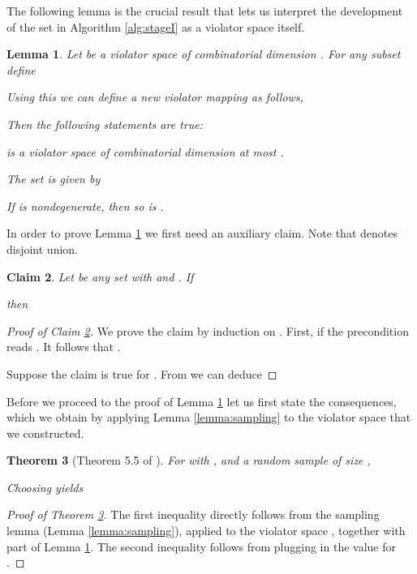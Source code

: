\documentclass[12pt]{article}
\newtheorem{theorem2}{Theorem}[section]
\newenvironment{theorem}{\begin{theorem2}}{\end{theorem2}}
\newtheorem{lemma2}[theorem2]{Lemma}
\newenvironment{lemma}{\begin{lemma2}}{\end{lemma2}}
\newtheorem{claim2}[theorem2]{Claim}
\newenvironment{claim}{\begin{claim2}}{\end{claim2}}
\theoremstyle{remark}
\let\newEnumerate=\enumerate
\renewenvironment{enumerate}{\newEnumerate\itemsep=0.0cm}{\endlist}
\begin{document}
    
    The following lemma is the crucial result that lets us interpret the development of the set  in
    Algorithm \ref{alg:stageI} as a violator space itself.
    \begin{lemma}
    \label{lemma:54}
    Let  be a violator space of combinatorial dimension . For any subset  define
    
    Using this we can define a new violator mapping as follows,
    
    Then the following statements are true:
    \begin{enumerate}
    \item[\emph{(i)}]  is a violator space of combinatorial dimension at most .
    \item[\emph{(ii)}] The set  is given by
    
    \item[\emph{(iii)}] If  is nondegenerate, then so is .
    \end{enumerate}
    \end{lemma}
    
    In order to prove Lemma \ref{lemma:54} we first need an auxiliary claim. Note that 
    denotes disjoint union.
    \begin{claim}
    \label{claim:1}
   Let  be any set with  and . If
   
   then
   
    \end{claim}
    \begin{proof}[Proof of Claim \ref{claim:1}]
    We prove the claim by induction on . First, if  the precondition reads . It follows that
    .
  
    
    Suppose the claim is true for . From  we can deduce
    
    \end{proof}
    
    Before we proceed to the proof of Lemma \ref{lemma:54} let us first state the consequences, which
    we obtain by applying Lemma \ref{lemma:sampling} to the violator space that we constructed.
    
    \begin{theorem}[Theorem 5.5 of \cite{GWSampl01}]
    \label{theorem:sizeofG}
     For  with ,  and a random sample of size ,
     
     Choosing  yields
     
    \end{theorem}
    \begin{proof}[Proof of Theorem \ref{theorem:sizeofG}]
    The first inequality directly follows from the sampling lemma (Lemma \ref{lemma:sampling}),  
applied
    to the violator space , together with part  of Lemma \ref{lemma:54}. The 
second
    inequality follows from plugging in the value for .
    \end{proof}
    
\end{document}
